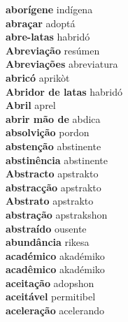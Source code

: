 \textbf{ aborígene  } indígena \\
\textbf{ abraçar  } adoptá \\
\textbf{ abre-latas  } habridó \\
\textbf{ Abreviação  } resúmen \\
\textbf{ Abreviações  } abreviatura \\
\textbf{ abricó  } aprikòt \\
\textbf{ Abridor de latas  } habridó \\
\textbf{ Abril  } aprel \\
\textbf{ abrir mão de  } abdica \\
\textbf{ absolvição  } pordon \\
\textbf{ abstenção  } abstinente \\
\textbf{ abstinência  } abstinente \\
\textbf{ Abstracto  } apstrakto \\
\textbf{ abstracção  } apstrakto \\
\textbf{ Abstrato  } apstrakto \\
\textbf{ abstração  } apstrakshon \\
\textbf{ abstraído  } ousente \\
\textbf{ abundância  } rikesa \\
\textbf{ académico  } akadémiko \\
\textbf{ acadêmico  } akadémiko \\
\textbf{ aceitação  } adopshon \\
\textbf{ aceitável  } permitibel \\
\textbf{ aceleração  } acelerando \\
